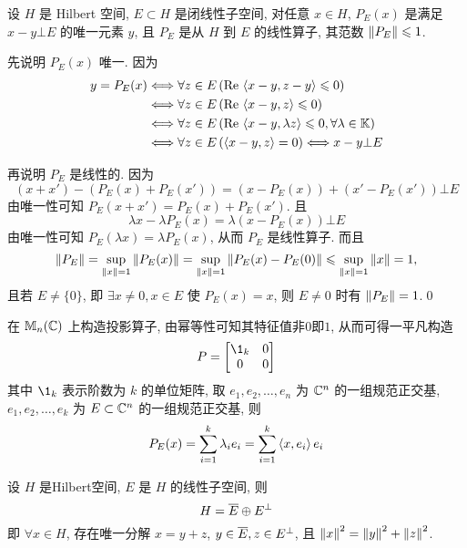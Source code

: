 \begin{Theorem}[投影线性算子]
	设 $ H $ 是 Hilbert 空间, $ E\subset H $ 是闭线性子空间,  对任意 $ x\in H $, $ P_{E}(x) $ 是满足 $ x- y\bot E $ 的唯一元素 $ y $, 且 $ P_{E} $ 是从 $ H $ 到 $ E $ 的线性算子, 其范数 $ \norm{P_{E}}\leqslant1 $.
\end{Theorem}

\begin{Proof}
	先说明 $ P_{E}(x) $ 唯一. 因为
	\[
		\begin{aligned}
			y=P_{E}(x) & \Longleftrightarrow \forall z\in E\,(\Re\lrangle{x-y, z-y}\leqslant0)                              \\
			           & \Longleftrightarrow \forall z\in E\,(\Re\lrangle{x-y, z}\leqslant0)                                \\
			           & \Longleftrightarrow \forall z\in E\,(\Re\lrangle{x-y, \lambda z}\leqslant0, \forall \lambda\in \K) \\
			           & \Longleftrightarrow \forall z\in E\,(\lrangle{x-y, z}=0)\Longleftrightarrow x-y\bot E
		\end{aligned}
	\]

	再说明 $ P_{E} $ 是线性的. 因为
	\[
		(x+x')-(P_{E}(x)+P_{E}(x'))=(x-P_{E}(x))+(x'-P_{E}(x'))\bot E
	\]
	由唯一性可知 $ P_{E}(x+x')=P_{E}(x)+P_{E}(x') $. 且
	\[
		\lambda x-\lambda P_{E}(x)=\lambda(x-P_{E}(x))\bot E
	\]
	由唯一性可知 $ P_{E}(\lambda x)=\lambda P_{E}(x) $, 从而 $ P_{E} $ 是线性算子. 而且
	\[
		\norm{P_{E}}=\sup_{\norm{x}=1}\norm{P_{E}(x)}=\sup_{\norm{x}=1}\norm{P_{E}(x)-P_{E}(0)}\leqslant\sup_{\norm{x}=1}\norm{x}=1,
	\]
	且若 $ E\ne \{ 0 \} $, 即 $ \exists x\ne 0, x\in E $ 使 $ P_{E}(x)=x $, 则 $ E\ne 0 $ 时有 $ \norm{P_{E}}=1 $.\qed
\end{Proof}

\begin{Example}
	在 $ \mathbb{M}_{n}(\C) $ 上构造投影算子, 由幂等性可知其特征值非$0$即$1$, 从而可得一平凡构造
	\[
		P=\begin{bmatrix}
			\1_{k} & 0 \\
			0      & 0
		\end{bmatrix}
	\]
	其中 $ \1_{k} $ 表示阶数为 $ k $ 的单位矩阵, 取 $ e_{1}, e_{2},\dots,e_{n} $ 为 $ \C^{n} $ 的一组规范正交基, $ e_{1}, e_{2},\dots,e_{k} $ 为 $ E\subset\C^{n} $ 的一组规范正交基, 则
	\[
		P_{E}(x)=\sum_{i=1}^{k}\lambda_{i}e_{i}=\sum_{i=1}^{k}\lrangle{x, e_{i}}e_{i}
	\]
\end{Example}

\begin{Corollary}[正交分解]
	设 $ H $ 是Hilbert空间, $ E $ 是 $ H $ 的线性子空间, 则
	\[
		H=\baro{E}\oplus E^{\bot}
	\]
	即 $ \forall x\in H $, 存在唯一分解 $ x=y+z $, $ y\in\baro{E}, z\in E^{\bot} $, 且 $ \norm{x}^{2}=\norm{y}^{2}+\norm{z}^{2} $.
\end{Corollary}

